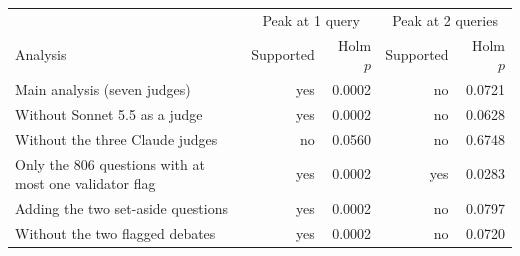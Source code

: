 \begin{tabular}{lrrrr}
\toprule
 & \multicolumn{2}{c}{Peak at 1 query} & \multicolumn{2}{c}{Peak at 2 queries} \\
Analysis & Supported & Holm $p$ & Supported & Holm $p$ \\
\midrule
Main analysis (seven judges) & yes & 0.0002 & no & 0.0721 \\
\midrule
Without Sonnet 5.5 as a judge & yes & 0.0002 & no & 0.0628 \\
Without the three Claude judges & no & 0.0560 & no & 0.6748 \\
Only the 806 questions with at most one validator flag & yes & 0.0002 & yes & 0.0283 \\
Adding the two set-aside questions & yes & 0.0002 & no & 0.0797 \\
Without the two flagged debates & yes & 0.0002 & no & 0.0720 \\
\bottomrule
\end{tabular}
